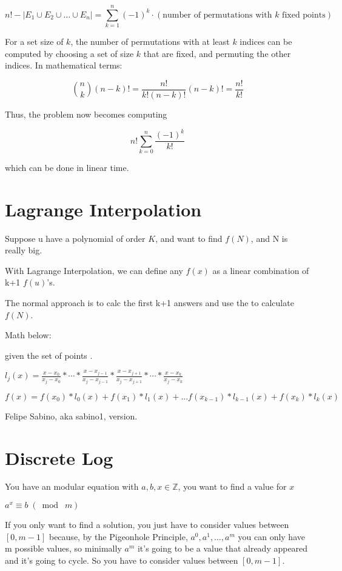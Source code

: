     $$n! - \lvert E_1 \cup E_2 \cup \dots \cup E_n \rvert = \sum_{k = 1}^n (-1)^k \cdot (\text{number of permutations with $k$ fixed points})$$
    
    For a set size of $k$, the number of permutations with at least $k$ indices can
    be computed by choosing a set of size $k$ that are fixed, and permuting the
    other indices. In mathematical terms:
    
    $${n \choose k}(n-k)! = \frac{n!}{k!(n-k)!}(n-k)! = \frac{n!}{k!}$$
    
    Thus, the problem now becomes computing
    
    $$n!\sum_{k=0}^n\frac{(-1)^k}{k!}$$
    
    which can be done in linear time.
    \section{Lagrange Interpolation}
    Suppose u have a polynomial of order $K$, and want to find $f(N)$, and N is really big.

    With Lagrange Interpolation, we can define any $f(x)$ as a linear combination of k+1 $f(u)$'s.

    The normal approach is to calc the first k+1 answers and use the to calculate $f(N)$.

    Math below:

    given the set of points .

    $l_j(x) = \frac{x-x_0}{x_j-x_0} * \cdots * \frac{x-x_{j-1}}{x_j-x_{j-1}} * \frac{x-x_{j+1}}{x_j-x_{j+1}} * \cdots * \frac{x-x_k}{x_j-x_k} $

    $f(x) = f(x_0)*l_0(x) + f(x_1)*l_1(x) + ... f(x_{k-1})*l_{k-1}(x) + f(x_k)*l_k(x) $
    
    
    Felipe Sabino, aka sabino1, version.
    
    \section{Discrete Log}

    \tab You have an modular equation with $a,b,x \in \mathbb{Z}$, you want to find a value for $x$
    
    $a^x \equiv b \;(\bmod\; m)$

    If you only want to find a solution, you just have to consider values between $[0,m-1]$ because, by the Pigeonhole Principle, $a^0,a^1,\dots,a^m$ you can only have m possible values, so minimally $a^m$ it's going to be a value that already appeared and it's going to cycle. So you have to consider values between $[0,m-1]$.

